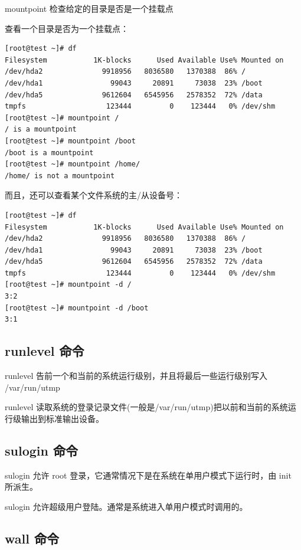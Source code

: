 mountpoint 检查给定的目录是否是一个挂载点

查看一个目录是否为一个挂载点：

{\begin{shaded}\begin{verbatim}
[root@test ~]# df 
Filesystem           1K-blocks      Used Available Use% Mounted on
/dev/hda2              9918956   8036580   1370388  86% /
/dev/hda1                99043     20891     73038  23% /boot
/dev/hda5              9612604   6545956   2578352  72% /data
tmpfs                   123444         0    123444   0% /dev/shm
[root@test ~]# mountpoint /
/ is a mountpoint
[root@test ~]# mountpoint /boot
/boot is a mountpoint
[root@test ~]# mountpoint /home/
/home/ is not a mountpoint
\end{verbatim}\end{shaded}}
而且，还可以查看某个文件系统的主/从设备号：

{\begin{shaded}\begin{verbatim}
[root@test ~]# df
Filesystem           1K-blocks      Used Available Use% Mounted on
/dev/hda2              9918956   8036580   1370388  86% /
/dev/hda1                99043     20891     73038  23% /boot
/dev/hda5              9612604   6545956   2578352  72% /data
tmpfs                   123444         0    123444   0% /dev/shm
[root@test ~]# mountpoint -d /
3:2
[root@test ~]# mountpoint -d /boot
3:1
\end{verbatim}\end{shaded}}
\subsection{runlevel 命令}

runlevel 告前一个和当前的系统运行级别，并且将最后一些运行级别写入
/var/run/utmp

runlevel
读取系统的登录记录文件(一般是/var/run/utmp)把以前和当前的系统运行级输出到标准输出设备。

\subsection{sulogin 命令}

sulogin 允许 root 登录，它通常情况下是在系统在单用户模式下运行时，由 init
所派生。

sulogin 允许超级用户登陆。通常是系统进入单用户模式时调用的。

\subsection{wall 命令}

